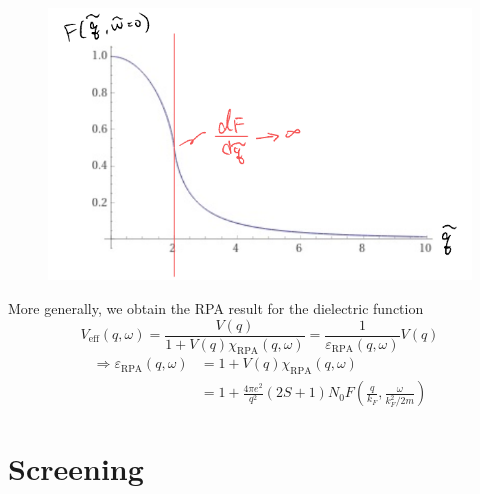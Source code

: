 \begin{figure}[H]
    \centering
    \includegraphics[width=\textwidth]{jupyterbook/data/fig/lec20-fig05.png}
\end{figure}
More generally, we obtain the RPA result for the dielectric function
\[ V_{\mathrm{eff}}\left( q,\omega \right) =\frac{V\left( q \right)}{1+V\left( q \right) \chi _{\mathrm{RPA}}\left( q,\omega \right)}=\frac{1}{\varepsilon _{\mathrm{RPA}}\left( q,\omega \right)}V\left( q \right) \]
\begin{align*}
    \Rightarrow \varepsilon _{\mathrm{RPA}}\left( q,\omega \right) &=1+V\left( q \right) \chi _{\mathrm{RPA}}\left( q,\omega \right) \\
    &=1+\frac{4\pi e^2}{q^2}\left( 2S+1 \right) N_0F\left( \frac{q}{k_F},\frac{\omega}{k_{F}^{2}/2m} \right)
\end{align*}

\section{Screening}

